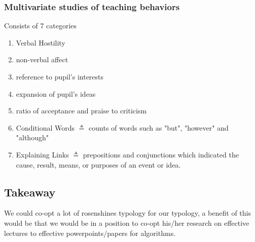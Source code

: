 \documentclass[10pt, letterpaper]{article}
\begin{document}
\subsubsection*{Multivariate studies of teaching behaviors}
\label{sec:orgdb1c94a}
Consists of 7 categories
\begin{enumerate}
\item Verbal Hostility
\item non-verbal affect
\item reference to pupil's interests
\item expansion of pupil's ideas
\item ratio of acceptance and praise to criticism
\item Conditional Words \(\triangleq\) counts of words such as "but", "however" and "although"
\item Explaining Links \(\triangleq\) prepositions and conjunctions which indicated the cause, result, means, or purposes of an event or idea.
\end{enumerate}

\subsection*{Takeaway}
\label{sec:org06973c0}
We could co-opt a lot of rosenshines typology for our typology, a benefit of this would be that we would be in a position to co-opt his/her research on effective lectures to effective powerpoints/papers for algorithms.




\end{document}
